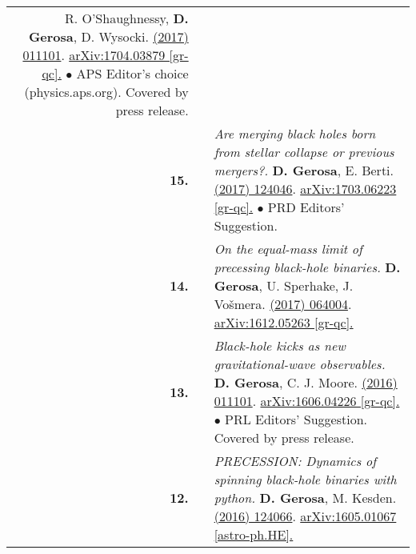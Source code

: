 {\begin{longtable}{rp{0.3cm}p{15.8cm}}
\newline{}
R. O'Shaughnessy, \textbf{D. Gerosa}, D. Wysocki.
\newline{}
\href{http://dx.doi.org/10.1103/PhysRevLett.119.011101}{\prl 119 (2017) 011101}. \href{https://arxiv.org/abs/1704.03879}{arXiv:1704.03879 [gr-qc].}
\newline{}
\textcolor{color1}{$\bullet$} APS Editor's choice (physics.aps.org). Covered by press release.
\vspace{0.09cm}\\
%
\textbf{15.} & & \textit{Are merging black holes born from stellar collapse or previous mergers?.}
\newline{}
\textbf{D. Gerosa}, E. Berti.
\newline{}
\href{http://dx.doi.org/10.1103/PhysRevD.95.124046}{\prd 95 (2017) 124046}. \href{https://arxiv.org/abs/1703.06223}{arXiv:1703.06223 [gr-qc].}
\newline{}
\textcolor{color1}{$\bullet$} PRD Editors' Suggestion.
\vspace{0.09cm}\\
%
\textbf{14.} & & \textit{On the equal-mass limit of precessing black-hole binaries.}
\newline{}
\textbf{D. Gerosa}, U. Sperhake, J. Vo\v{s}mera.
\newline{}
\href{http://dx.doi.org/10.1088/1361-6382/aa5e58}{\cqg 34 (2017) 064004}. \href{https://arxiv.org/abs/1612.05263}{arXiv:1612.05263 [gr-qc].}
\vspace{0.09cm}\\
%
\textbf{13.} & & \textit{Black-hole kicks as new gravitational-wave observables.}
\newline{}
\textbf{D. Gerosa}, C. J. Moore.
\newline{}
\href{http://dx.doi.org/10.1103/PhysRevLett.117.011101}{\prl 117 (2016) 011101}. \href{https://arxiv.org/abs/1606.04226}{arXiv:1606.04226 [gr-qc].}
\newline{}
\textcolor{color1}{$\bullet$} PRL Editors' Suggestion. Covered by press release.
\vspace{0.09cm}\\
%
\textbf{12.} & & \textit{PRECESSION: Dynamics of spinning black-hole binaries with python.}
\newline{}
\textbf{D. Gerosa}, M. Kesden.
\newline{}
\href{http://dx.doi.org/10.1103/PhysRevD.93.124066}{\prd 93 (2016) 124066}. \href{https://arxiv.org/abs/1605.01067}{arXiv:1605.01067 [astro-ph.HE].}
\newline{}

\end{longtable}}

